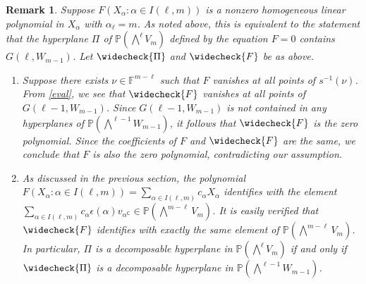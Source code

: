 \documentclass[10pt,a4paper,oneside]{amsproc}
\newtheorem{remark}[theorem]{Remark}
\def\a{{\alpha}}
\def\FF{{\mathbb F}}
\def\PP{{\mathbb P}}
\begin{document}
\begin{remark}\label{rem2}\normalfont
Suppose $F(X_\a : \a \in I(\ell, m))$ is a nonzero homogeneous linear polynomial in $X_\a$ with $\a_\ell = m$. As noted above, this is equivalent to the statement that the hyperplane $\Pi$ of $\PP (\bigwedge^{\ell} V_m)$ defined by the equation $F = 0$ contains $G(\ell, W_{m-1})$. Let $\widecheck{\Pi}$ and $\widecheck{F}$ be as above. 
    \begin{enumerate}
        \item[(a)] Suppose there exists $\nu \in \FF^{m-\ell}$ such that $F$ vanishes at all points of $s^{-1}(\nu)$. From \eqref{eval}, we see that $\widecheck{F}$ vanishes at all points of $G(\ell - 1, W_{m-1})$. Since $G(\ell - 1, W_{m-1})$ is not contained in any hyperplanes of $\PP(\bigwedge^{\ell-1} W_{m-1})$, it follows that $\widecheck{F}$ is the zero polynomial. Since the 
coefficients of $F$ and $\widecheck{F}$ are the same, we conclude 
that $F$ is also the zero polynomial, contradicting our assumption.

        \item[(b)] As discussed in the previous section, the polynomial $F(X_\a : \a \in I(\ell, m)) = \displaystyle{\sum_{\a \in I(\ell, m)}} c_\a X_\a$ identifies with the element $\displaystyle{\sum_{\a \in I(\ell, m)}} c_\a \epsilon (\a) v_{\a^{\mathsf{C}}} \in \PP \left(\bigwedge^{m-\ell} V_m\right)$. It is easily verified that $\widecheck{F}$ identifies with exactly the same element of $\PP (\bigwedge^{m-\ell} V_m)$. In particular, $\Pi$ is a decomposable hyperplane in $\PP (\bigwedge^{\ell} V_m)$ if and only if $\widecheck{\Pi}$ is a decomposable hyperplane in $\PP \left(\bigwedge^{\ell-1} W_{m-1}\right)$. 
    \end{enumerate}
\end{remark}










 
\end{document}

